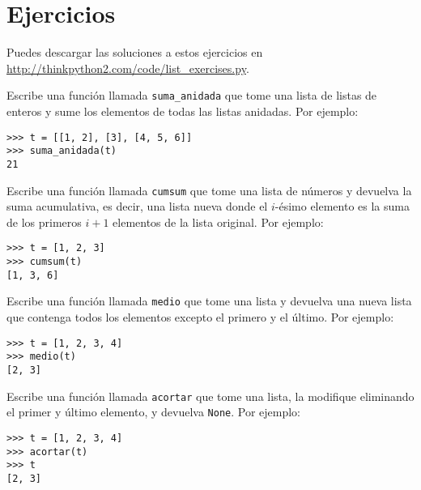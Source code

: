 \documentclass[10pt]{book}
\begin{document}
\section{Ejercicios}

Puedes descargar las soluciones a estos ejercicios en
\url{http://thinkpython2.com/code/list_exercises.py}.

\begin{exercise}

Escribe una función llamada \verb"suma_anidada" que tome una lista de listas
de enteros y sume los elementos de todas las listas anidadas.
Por ejemplo:

\begin{verbatim}
>>> t = [[1, 2], [3], [4, 5, 6]]
>>> suma_anidada(t)
21
\end{verbatim}

\end{exercise}

\begin{exercise}
\label{cumulative}

Escribe una función llamada {\tt cumsum} que tome una lista de números y
devuelva la suma acumulativa, es decir, una lista nueva donde el $i$-ésimo
elemento es la suma de los primeros $i+1$ elementos de la lista original.
Por ejemplo:

\begin{verbatim}
>>> t = [1, 2, 3]
>>> cumsum(t)
[1, 3, 6]
\end{verbatim}

\end{exercise}

\begin{exercise}

Escribe una función llamada \verb"medio" que tome una lista y
devuelva una nueva lista que contenga todos los elementos excepto el primero
y el último.  Por ejemplo:

\begin{verbatim}
>>> t = [1, 2, 3, 4]
>>> medio(t)
[2, 3]
\end{verbatim}

\end{exercise}

\begin{exercise}

Escribe una función llamada \verb"acortar" que tome una lista, la modifique
eliminando el primer y último elemento, y devuelva {\tt None}.
Por ejemplo:

\begin{verbatim}
>>> t = [1, 2, 3, 4]
>>> acortar(t)
>>> t
[2, 3]
\end{verbatim}

\end{exercise}
\end{document}
